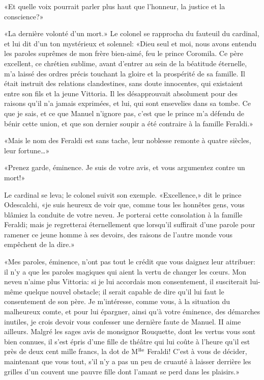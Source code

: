 «Et quelle voix pourrait parler plus haut que l'honneur, la justice et la conscience?»

«La dernière volonté d'un mort.» Le colonel se rapprocha du fauteuil du cardinal, et lui dit d'un ton mystérieux et solennel: «Dieu seul et moi, nous avons entendu les paroles suprêmes de mon frère bien-aimé, feu le prince Coromila. Ce père excellent, ce chrétien sublime, avant d'entrer au sein de la béatitude éternelle, m'a laissé des ordres précis touchant la gloire et la prospérité de sa famille. Il était instruit des relations clandestines, sans doute innocentes, qui existaient entre son fils et la jeune Vittoria. Il les désapprouvait absolument pour des raisons qu'il n'a jamais exprimées, et lui, qui sont ensevelies dans sa tombe. Ce que je sais, et ce que Manuel n'ignore pas, c'est que le prince m'a défendu de bénir cette union, et que son dernier soupir a été contraire à la famille Feraldi.»

«Mais le nom des Feraldi est sans tache, leur noblesse remonte à quatre siècles, leur fortune\ldots{}»

«Prenez garde, éminence. Je suis de votre avis, et vous argumentez contre un mort!»

Le cardinal se leva; le colonel suivit son exemple. «Excellence,» dit le prince Odescalchi, «je suis heureux de voir que, comme tous les honnêtes gens, vous blâmiez la conduite de votre neveu. Je porterai cette consolation à la famille Feraldi; mais je regretterai éternellement que lorsqu'il suffirait d'une parole pour ramener ce jeune homme à ses devoirs, des raisons de l'autre monde vous empêchent de la dire.»

«Mes paroles, éminence, n'ont pas tout le crédit que vous daignez leur attribuer: il n'y a que les paroles magiques qui aient la vertu de changer les c\oe{}urs. Mon neveu n'aime plus Vittoria: si je lui accordais mon consentement, il susciterait lui-même quelque nouvel obstacle; il serait capable de dire qu'il lui faut le consentement de son père. Je m'intéresse, comme vous, à la situation du malheureux comte, et pour lui épargner, ainsi qu'à votre éminence, des démarches inutiles, je crois devoir vous confesser une dernière faute de Manuel. II aime ailleurs. Malgré les sages avis de monsignor Rouquette, dont les vertus vous sont bien connues, il s'est épris d'une fille de théâtre qui lui coûte à l'heure qu'il est près de deux cent mille francs, la dot de M$\textsuperscript{lle}$ Feraldi! C'est à vous de décider, maintenant que vous tout, s'il n'y a pas un peu de cruauté à laisser derrière les grilles d'un couvent une pauvre fille dont l'amant se perd dans les plaisirs.»

